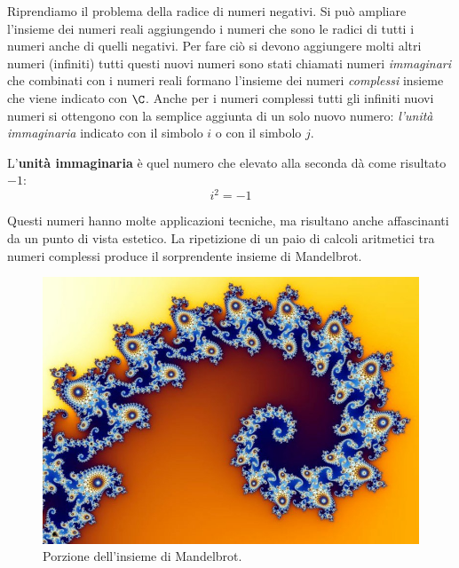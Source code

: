 Riprendiamo il problema della radice di numeri negativi. Si può ampliare 
l'insieme dei numeri reali aggiungendo i numeri che sono le 
radici di tutti i numeri anche di quelli negativi. Per fare ciò si devono 
aggiungere molti altri numeri (infiniti) tutti questi nuovi numeri sono 
stati chiamati numeri \emph{immaginari} che combinati con i numeri reali 
formano l'insieme dei numeri \emph{complessi} insieme che viene indicato 
con 
\(\C\). 
Anche per i numeri complessi tutti gli infiniti nuovi numeri si ottengono 
con la semplice aggiunta di un solo nuovo numero: \emph{l'unità 
immaginaria} indicato con il simbolo \(i\) o con il simbolo \(j\).
\begin{definizione}
 L'\textbf{unità immaginaria} è quel numero che elevato alla seconda dà 
come risultato \(-1\):
\[i^2 = -1\]
\end{definizione}

Questi numeri hanno molte applicazioni tecniche, ma risultano anche 
affascinanti da un punto di vista estetico. La ripetizione di un paio di 
calcoli aritmetici tra numeri complessi produce il sorprendente insieme di 
Mandelbrot.

\begin{figure}
\begin{center}
\begin{inaccessibleblock}
\includegraphics[scale=0.40]{img/fractal.jpg}
\end{inaccessibleblock}
\caption{Porzione dell'insieme di Mandelbrot.}
\label{fig:mandelbrot}
\end{center}
\end{figure}

